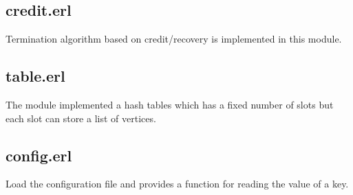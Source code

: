 \documentclass[11pt,a4paper]{article}
\begin{document}
\subsection*{credit.erl}
Termination algorithm based on credit/recovery is implemented in this module. 

\subsection*{table.erl}
The module implemented a hash tables which has a fixed number of slots but each slot can store a list of vertices. 

\subsection*{config.erl}
Load the configuration file and provides a function for reading the value of a key. 



\end{document}
